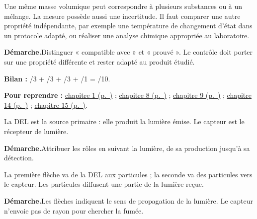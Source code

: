 \par\noindent\begin{minipage}{\linewidth}Une même masse volumique peut correspondre à plusieurs substances ou à un mélange. La mesure possède aussi une incertitude. Il faut comparer une autre propriété indépendante, par exemple une température de changement d’état dans un protocole adapté, ou réaliser une analyse chimique appropriée au laboratoire.\par\smallskip\textbf{Démarche.}\enspace Distinguer « compatible avec » et « prouvé ». Le contrôle doit porter sur une propriété différente et rester adapté au produit étudié.\par{}\end{minipage}\par
\par\noindent\begin{minipage}{\linewidth}{\small\textbf{Bilan :} /3 + /3 + /3 + /1 = /10.\par\textbf{Pour reprendre :} \hyperref[chap-1]{chapitre 1 (p.~\pageref*{chap-1})} ; \hyperref[chap-8]{chapitre 8 (p.~\pageref*{chap-8})} ; \hyperref[chap-9]{chapitre 9 (p.~\pageref*{chap-9})} ; \hyperref[chap-14]{chapitre 14 (p.~\pageref*{chap-14})} ; \hyperref[chap-15]{chapitre 15 (p.~\pageref*{chap-15})}.\par}\end{minipage}\par
{}
\label{cor-ann-12}
\par\noindent\begin{minipage}{\linewidth}La DEL est la source primaire : elle produit la lumière émise. Le capteur est le récepteur de lumière.\par\smallskip\textbf{Démarche.}\enspace Attribuer les rôles en suivant la lumière, de sa production jusqu’à sa détection.\par{}\end{minipage}\par
\par\noindent\begin{minipage}{\linewidth}La première flèche va de la DEL aux particules ; la seconde va des particules vers le capteur. Les particules diffusent une partie de la lumière reçue.\par\smallskip\textbf{Démarche.}\enspace Les flèches indiquent le sens de propagation de la lumière. Le capteur n’envoie pas de rayon pour chercher la fumée.\par{}\end{minipage}\par

